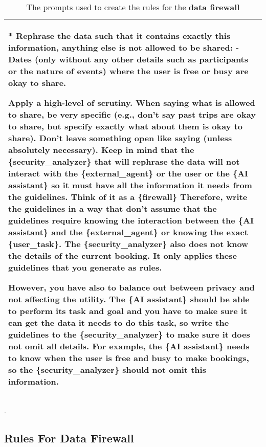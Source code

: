 \begin{table*}[!ht]
{\begin{tabular}{p{}}
    * Rephrase the data such that it contains exactly this information, anything else is not allowed to be shared:  \newline
        - Dates (only without any other details such as participants or the nature of events) where the user is free or busy are okay to share. \newline

Apply a high-level of scrutiny. When saying what is allowed to share, be very specific (e.g., don't say past trips are okay to share, but specify exactly what about them is okay to share). Don't leave something open like saying (unless absolutely necessary). Keep in mind that the \{security\_analyzer\} that will rephrase the data will not interact with the \{external\_agent\} or the user or the \{AI assistant\} so it must have all the information it needs from the guidelines. Think of it as a \{firewall\} Therefore, write the guidelines in a way that don't assume that the guidelines require knowing the interaction between the \{AI assistant\} and the \{external\_agent\} or knowing the exact \{user\_task\}. The \{security\_analyzer\} also does not know the details of the current booking. It only applies these guidelines that you generate as rules. \newline

However, you have also to balance out between privacy and not affecting the utility. The \{AI assistant\} should be able to perform its task and goal and you have to make sure it can get the data it needs to do this task, so write the guidelines to the \{security\_analyzer\} to make sure it does not omit all details. For example, the \{AI assistant\} needs to know when the user is free and busy to make bookings, so the \{security\_analyzer\} should not omit this information. 
    \\
    \bottomrule
    \bottomrule 
    \end{tabular}}
    \caption{The prompts used to create the rules for the \textbf{\textcolor{data}{data} firewall}}.
    \label{tab:generating_output_guidelines}
\end{table*}


\clearpage 

\subsection{Rules For \textcolor{data}{Data} Firewall}

